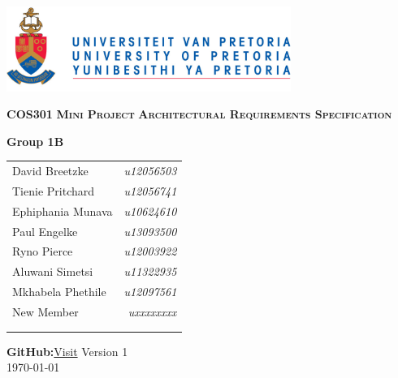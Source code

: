 \begin{titlepage}
\begin{center}
\includegraphics[width=350px]{University_of_Pretoria_Logo.png}
\newline
\newline


\begin{flushright} \large
\textbf {\textsc{\LARGE COS301}}\newline
\textbf {\textsc{\LARGE Mini Project}}\newline
\textbf {\textsc{\LARGE Architectural Requirements Specification}}\newline
\end{flushright}



\textbf{Group 1B} \\

\vspace{0.5 cm}
\begin{tabular}{lr}
David Breetzke&\emph{u12056503} \\
Tienie Pritchard&\emph{u12056741} \\
Ephiphania Munava&\emph{u10624610} \\
Paul Engelke&\emph{u13093500} \\
Ryno Pierce&\emph{u12003922} \\
Aluwani Simetsi&\emph{u11322935} \\
Mkhabela Phethile&\emph{u12097561} \\
New Member&\emph{uxxxxxxxx} \\ 
\\
\\

\end{tabular}

\vspace{1cm}
\textbf{GitHub:}\href{https://github.com/davidbreetzke/COS_301_Phase2_1B}{Visit}
\vfill
{\large Version 1}
\\
{\large \today}

\end{center}
\end{titlepage}
